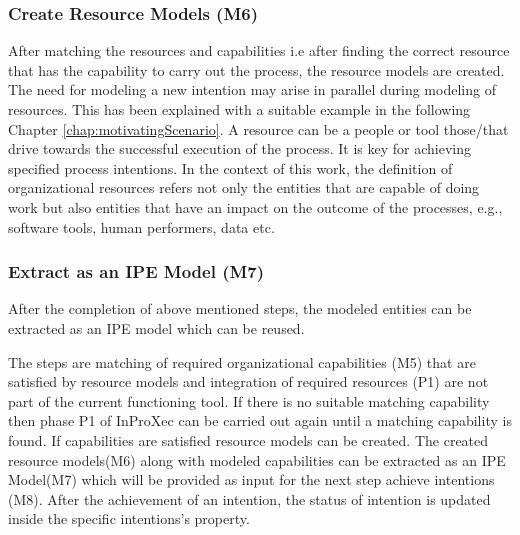 \subsubsection{Create Resource Models (M6)}  
After matching the resources and capabilities i.e after finding the correct resource that has the capability to carry out the process, the resource models are created. The need for modeling a new intention may arise in parallel during modeling of resources. This has been explained with a suitable example in the following Chapter \ref{chap:motivatingScenario}.  A resource can be a people or tool those/that drive towards the successful execution of the process. It is key for achieving specified process intentions. In the context of this work, the definition of organizational resources refers not only the entities that are capable of doing work but also entities that have an impact on the outcome of the processes, e.g., software tools, human performers, data etc.      

\subsubsection{Extract as an IPE Model (M7)}  
After the completion of above mentioned steps, the modeled entities can be extracted as an IPE model which can be reused. 

The steps are matching of required organizational capabilities (M5) that are satisfied by resource models and integration of required resources (P1) are not part of the current functioning tool. If there is no suitable matching capability then phase P1 of InProXec can be carried out again until a matching capability is found. If capabilities are satisfied resource models can be created. The created resource models(M6) along with modeled capabilities can be extracted as an IPE Model(M7) which will be provided as input for the next step achieve intentions (M8). After the achievement of an intention, the status of intention is updated inside the specific intentions's property. 

